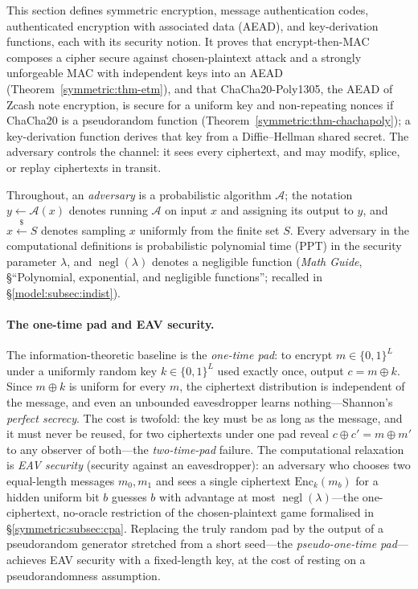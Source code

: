 \documentclass[11pt,a4paper]{article}
\theoremstyle{definition}
\theoremstyle{remark}
\DeclareMathOperator{\negl}{negl}
\begin{document}
This section defines symmetric encryption, message authentication codes,
authenticated encryption with associated data (AEAD), and key-derivation
functions, each with its security notion. It proves that encrypt-then-MAC
composes a cipher secure against chosen-plaintext attack and a strongly
unforgeable MAC with independent keys into an AEAD
(Theorem~\ref{symmetric:thm-etm}), and that ChaCha20-Poly1305, the AEAD
of Zcash note encryption, is secure for a uniform key and non-repeating
nonces if ChaCha20 is a pseudorandom function
(Theorem~\ref{symmetric:thm-chachapoly}); a key-derivation function
derives that key from a Diffie--Hellman shared secret. The adversary
controls the channel: it sees every ciphertext, and may modify, splice,
or replay ciphertexts in transit.

Throughout, an \emph{adversary} is a probabilistic algorithm
\(\mathcal{A}\); the notation \(y \gets \mathcal{A}(x)\) denotes
running \(\mathcal{A}\) on input \(x\) and assigning its output to
\(y\), and \(x \xleftarrow{\$} S\) denotes sampling \(x\) uniformly
from the finite set \(S\). Every adversary in the computational
definitions is probabilistic polynomial time (PPT) in the security
parameter \(\lambda\), and \(\negl(\lambda)\) denotes a negligible
function (\emph{Math Guide}, \S``Polynomial, exponential, and
negligible functions''; recalled in \S\ref{model:subsec:indist}).

\paragraph{The one-time pad and EAV security.}
The information-theoretic baseline is the \emph{one-time pad}: to
encrypt \(m \in \{0,1\}^{L}\) under a uniformly random key
\(k \in \{0,1\}^{L}\) used exactly once, output \(c = m \oplus k\).
Since \(m \oplus k\) is uniform for every \(m\), the ciphertext
distribution is independent of the message, and even an unbounded
eavesdropper learns nothing---Shannon's \emph{perfect secrecy}. The
cost is twofold: the key must be as long as the message, and it must
never be reused, for two ciphertexts under one pad reveal
\(c \oplus c' = m \oplus m'\) to any observer of both---the
\emph{two-time-pad} failure. The
computational relaxation is \emph{EAV security} (security against an
eavesdropper): an adversary who chooses two equal-length messages
\(m_{0}, m_{1}\) and sees a single ciphertext
\(\mathrm{Enc}_{k}(m_{b})\) for a hidden uniform bit \(b\) guesses
\(b\) with advantage at most \(\negl(\lambda)\)---the one-ciphertext,
no-oracle restriction of the chosen-plaintext game formalised in
\S\ref{symmetric:subsec:cpa}. Replacing the truly random pad by the
output of a pseudorandom generator stretched from a short seed---the
\emph{pseudo-one-time pad}---achieves EAV security with a
fixed-length key, at the cost of resting on a pseudorandomness
assumption.
\end{document}
